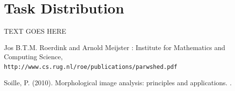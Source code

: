\documentclass{article}
\begin{document}
\section{Task Distribution}
\begin{flushleft}
TEXT GOES HERE
\end{flushleft}

\newpage

\begin{thebibliography}{9}
\label{sec:hello}



Jos B.T.M. Roerdink and Arnold Meijster : \newline
Institute for Mathematics and Computing Science, 
\\\texttt{http://www.cs.rug.nl/roe/publications/parwshed.pdf}


Soille, P. (2010). Morphological image analysis: principles and applications. 
. 

\end{thebibliography}
\end{document}
